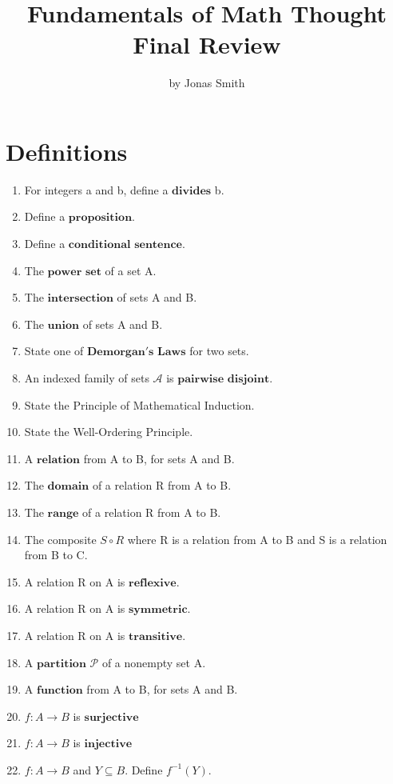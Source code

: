\documentclass[11pt]{article}
\begin{document}
\author{by Jonas Smith}
\title{Fundamentals of Math Thought Final Review}
\maketitle

\medskip

\section*{Definitions}
\begin{enumerate}
    \item For integers a and b, define a $\mathbf{divides}$ b.
    \item Define a $\mathbf{proposition}$.
    \item Define a $\mathbf{conditional}$ $\mathbf{sentence}$.
    \item The $\mathbf{power}$ $\mathbf{set}$ of a set A.
    \item The $\mathbf{intersection}$ of sets A and B.
    \item The $\mathbf{union}$ of sets A and B.
    \item State one of $\mathbf{Demorgan's}$ $\mathbf{Laws}$ for two sets.
    \item An indexed family of sets $\mathscr{A}$ is $\mathbf{pairwise}$ $\mathbf{disjoint}$.
    \item State the Principle of Mathematical Induction.
    \item State the Well-Ordering Principle.
    \item A $\mathbf{relation}$ from A to B, for sets A and B.
    \item The $\mathbf{domain}$ of a relation R from A to B.
    \item The $\mathbf{range}$ of a relation R from A to B.
    \item The composite $S \circ R$ where R is a relation from A to B and S is a relation from B to C. 
    \item A relation R on A is $\mathbf{reflexive}$.
    \item A relation R on A is $\mathbf{symmetric}$.
    \item A relation R on A is $\mathbf{transitive}$.
    \item A $\mathbf{partition}$ $\mathscr{P}$ of a nonempty set A.
    \item A $\mathbf{function}$ from A to B, for sets A and B.
    \item $f:A\rightarrow B$ is $\mathbf{surjective}$
    \item $f:A\rightarrow B$ is $\mathbf{injective}$
    \item $f:A\rightarrow B$ and $Y \subseteq B$. Define $f^{-1}(Y).$
\end{enumerate}
\pagebreak
\end{document}
